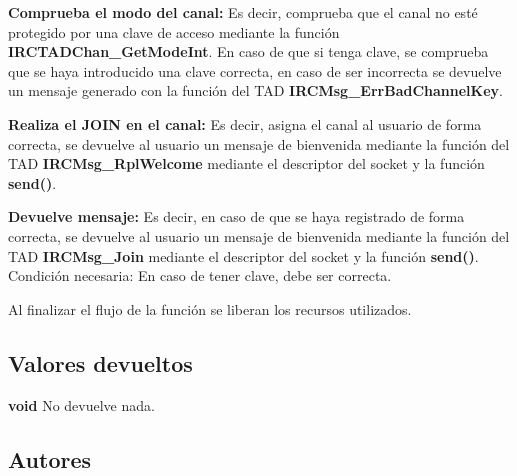 \begin{DoxyItemize}
\item {\bfseries Comprueba el modo del canal\+:} Es decir, comprueba que el canal no esté protegido por una clave de acceso mediante la función {\bfseries I\+R\+C\+T\+A\+D\+Chan\+\_\+\+Get\+Mode\+Int}. En caso de que si tenga clave, se comprueba que se haya introducido una clave correcta, en caso de ser incorrecta se devuelve un mensaje generado con la función del T\+A\+D {\bfseries I\+R\+C\+Msg\+\_\+\+Err\+Bad\+Channel\+Key}.  
\item {\bfseries Realiza el J\+O\+I\+N en el canal\+:} Es decir, asigna el canal al usuario de forma correcta, se devuelve al usuario un mensaje de bienvenida mediante la función del T\+A\+D {\bfseries I\+R\+C\+Msg\+\_\+\+Rpl\+Welcome} mediante el descriptor del socket y la función {\bfseries send()}. 
\item {\bfseries Devuelve mensaje\+:} Es decir, en caso de que se haya registrado de forma correcta, se devuelve al usuario un mensaje de bienvenida mediante la función del T\+A\+D {\bfseries I\+R\+C\+Msg\+\_\+\+Join} mediante el descriptor del socket y la función {\bfseries send()}. ~\newline
Condición necesaria\+: En caso de tener clave, debe ser correcta.  
\end{DoxyItemize}

Al finalizar el flujo de la función se liberan los recursos utilizados.\hypertarget{server_command_join_return_join}{}\subsection{Valores devueltos}\label{server_command_join_return_join}

\begin{DoxyItemize}
\item {\bfseries void} No devuelve nada. 
\end{DoxyItemize}\hypertarget{server_command_join_authors_join}{}\subsection{Autores}\label{server_command_join_authors_join}

